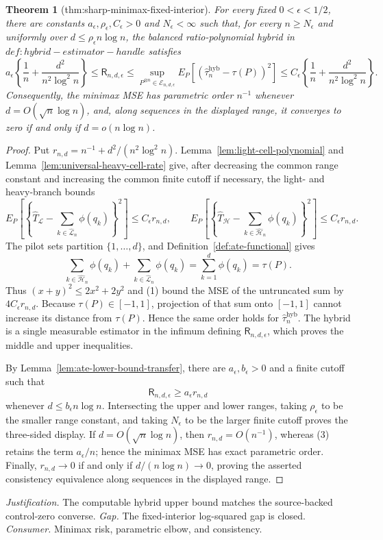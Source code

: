 \documentclass{article}
\newtheorem{theorem}{Theorem}
\begin{document}
\begin{theorem}[thm:sharp-minimax-fixed-interior]\label{thm:sharp-minimax-fixed-interior}
For every fixed \(0<\epsilon<1/2\), there are constants \(a_\epsilon,\rho_\epsilon,C_\epsilon>0\) and \(N_\epsilon<\infty\) such that, for every \(n\ge N_\epsilon\) and uniformly over \(d\le\rho_\epsilon n\log n\), the balanced ratio-polynomial hybrid in \(def:hybrid-estimator-handle\) satisfies
\[
a_\epsilon\left\{\frac1n+\frac{d^2}{n^2\log^2n}\right\}\le\mathsf R_{n,d,\epsilon}\le\sup_{P^{\otimes n}\in\mathcal E_{n,d,\epsilon}}E_P[(\widehat\tau_n^{\mathrm{hyb}}-\tau(P))^2]\le C_\epsilon\left\{\frac1n+\frac{d^2}{n^2\log^2n}\right\}.
\]
Consequently, the minimax MSE has parametric order \(n^{-1}\) whenever \(d=O(\sqrt n\log n)\), and, along sequences in the displayed range, it converges to zero if and only if \(d=o(n\log n)\).
\end{theorem}
\begin{proof}
Put \(r_{n,d}=n^{-1}+d^2/(n^2\log^2n)\). Lemma~\ref{lem:light-cell-polynomial} and Lemma~\ref{lem:universal-heavy-cell-rate} give, after decreasing the common range constant and increasing the common finite cutoff if necessary, the light- and heavy-branch bounds
\[
E_P\left[\left\{\widehat T_{\mathcal L}-\sum_{k\in\widehat{\mathcal L}_n}\phi(q_k)\right\}^2\right]\le C_\epsilon r_{n,d},\qquad E_P\left[\left\{\widehat T_{\mathcal H}-\sum_{k\in\widehat{\mathcal H}_n}\phi(q_k)\right\}^2\right]\le C_\epsilon r_{n,d}.
\tag{1}
\]
The pilot sets partition \(\{1,\ldots,d\}\), and Definition~\ref{def:ate-functional} gives
\[
\sum_{k\in\widehat{\mathcal H}_n}\phi(q_k)+\sum_{k\in\widehat{\mathcal L}_n}\phi(q_k)=\sum_{k=1}^d\phi(q_k)=\tau(P).
\tag{2}
\]
Thus \((x+y)^2\le2x^2+2y^2\) and (1) bound the MSE of the untruncated sum by \(4C_\epsilon r_{n,d}\). Because \(\tau(P)\in[-1,1]\), projection of that sum onto \([-1,1]\) cannot increase its distance from \(\tau(P)\). Hence the same order holds for \(\widehat\tau_n^{\mathrm{hyb}}\). The hybrid is a single measurable estimator in the infimum defining \(\mathsf R_{n,d,\epsilon}\), which proves the middle and upper inequalities.

By Lemma~\ref{lem:ate-lower-bound-transfer}, there are \(a_\epsilon,b_\epsilon>0\) and a finite cutoff such that
\[
\mathsf R_{n,d,\epsilon}\ge a_\epsilon r_{n,d}
\tag{3}
\]
whenever \(d\le b_\epsilon n\log n\). Intersecting the upper and lower ranges, taking \(\rho_\epsilon\) to be the smaller range constant, and taking \(N_\epsilon\) to be the larger finite cutoff proves the three-sided display. If \(d=O(\sqrt n\log n)\), then \(r_{n,d}=O(n^{-1})\), whereas (3) retains the term \(a_\epsilon/n\); hence the minimax MSE has exact parametric order. Finally, \(r_{n,d}\to0\) if and only if \(d/(n\log n)\to0\), proving the asserted consistency equivalence along sequences in the displayed range.
\end{proof}
\par\smallskip\noindent \textit{Justification.} The computable hybrid upper bound matches the source-backed control-zero converse. \textit{Gap.} The fixed-interior log-squared gap is closed. \textit{Consumer.} Minimax risk, parametric elbow, and consistency.
\end{document}
